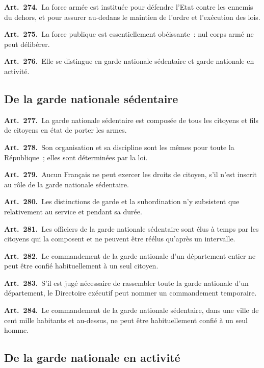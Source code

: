 \documentclass[french,twoside]{book} %
\newcommand{\labelchar}[1]{\textbf{\color{rubric} #1}}
\begin{document}
\labelchar{Art. 274.} La force armée est instituée pour défendre l’Etat contre les ennemis du dehors, et pour assurer au-dedans le maintien de l’ordre et l’exécution des lois.\par
\labelchar{Art. 275.} La force publique est essentiellement obéissante : nul corps armé ne peut délibérer.\par
\labelchar{Art. 276.} Elle se distingue en garde nationale sédentaire et garde nationale en activité.\par

\subsection[{De la garde nationale sédentaire}]{De la garde nationale sédentaire}

\labelchar{Art. 277.} La garde nationale sédentaire est composée de tous les citoyens et fils de citoyens en état de porter les armes.\par
\labelchar{Art. 278.} Son organisation et sa discipline sont les mêmes pour toute la République ; elles sont déterminées par la loi.\par
\labelchar{Art. 279.} Aucun Français ne peut exercer les droits de citoyen, s’il n’est inscrit au rôle de la garde nationale sédentaire.\par
\labelchar{Art. 280.} Les distinctions de garde et la subordination n’y subsistent que relativement au service et pendant sa durée.\par
\labelchar{Art. 281.} Les officiers de la garde nationale sédentaire sont élus à temps par les citoyens qui la composent et ne peuvent être réélus qu’après un intervalle.\par
\labelchar{Art. 282.} Le commandement de la garde nationale d’un département entier ne peut être confié habituellement à un seul citoyen.\par
\labelchar{Art. 283.} S’il est jugé nécessaire de rassembler toute la garde nationale d’un département, le Directoire exécutif peut nommer un commandement temporaire.\par
\labelchar{Art. 284.} Le commandement de la garde nationale sédentaire, dans une ville de cent mille habitants et au-dessus, ne peut être habituellement confié à un seul homme.

\subsection[{De la garde nationale en activité}]{De la garde nationale en activité}
\end{document}
